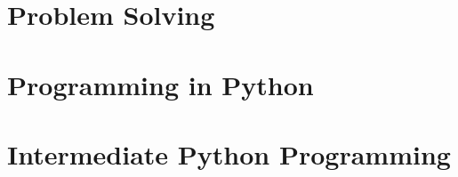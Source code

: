 \documentclass[12pt,twoside]{book}
\begin{document}
\mainmatter

\part{Problem Solving}

\adjustmtc
\adjustmtc
\adjustmtc
\adjustmtc












\part{Programming in Python}







% 
% 




\part{Intermediate Python Programming}





\appendix
\appendixpage
\addappheadtotoc
% 



\backmatter

\printindex
\end{document}
